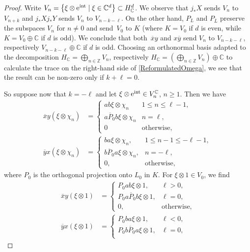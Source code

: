 \documentclass[10pt,a4paper]{amsart}
\numberwithin{equation}{section}
\newcommand{\Z}{\mathbb{Z}}
\newcommand{\C}{\mathbb{C}}
\begin{document}
\begin{proof}
Write $V_n = \big\{\xi \otimes {\rm e}^{\rm int} \mid \xi \in \C^d\big\} \subset H^d_\C$.
We observe that $j_*X$ sends $V_n$ to $V_{n+k}$ and $j_*Xj_*Y$ sends $V_n$ to $V_{n-k-\ell}$.
On the other hand, $P_L$ and $P_{\overline{L}}$ preserve the subspaces $V_n$ for $n \neq 0$ and send~$V_0$ to $K$ (where $K = V_0$ if $d$ is even, while $K = V_0 \oplus \C$ if $d$ is odd).
We conclude that both~$\overline{x} y$ and $x \overline{y}$ send $V_n$ to $V_{n-k-\ell}$, respectively $V_{n-k-\ell} \oplus \C$ if $d$ is odd.
Choosing an orthonormal basis adapted to the decomposition $H_\C = \bigoplus_{n \in \Z} V_n$, respectively $H_\C = (\bigoplus_{n \in \Z} V_n) \oplus \C$ to calculate the trace on the right-hand side of \eqref{ReformulatedOmega}, we see that the result can be non-zero only if $k+\ell = 0$.

So suppose now that $k = - \ell$ and let $\xi \otimes {\rm e}^{{\rm int}} \in V_n^\C$, $n \geq 1$. Then we have
\begin{align*}
 \overline{x}y(\xi\otimes \chi_n) &=
 \begin{cases}
 ab\xi \otimes \chi_{n} & 1 \leq n \leq \ell -1, \\
 a\overline{P}_0b\xi \otimes \chi_{n} & n = \ell,\\
 0 & \text{otherwise},
 \end{cases}
 \\
 \overline{y}x(\xi \otimes \chi_n) &=
 \begin{cases}
 ba\xi \otimes \chi_{n}, & 1 \leq n -1 \leq -\ell -1, \\
 b\overline{P}_0a\xi \otimes \chi_{n}, & n = - \ell,\\
 0, & \text{otherwise},
 \end{cases}	
\end{align*}
where $P_0$ is the orthogonal projection onto $L_0$ in $K$.
For $\xi \otimes 1 \in V_0$, we find
\begin{align*}
 \overline{x}y(\xi\otimes 1) &=
 \begin{cases}
 P_0ab\xi \otimes 1, & \ell > 0, \\
 P_0a\overline{P}_0b\xi \otimes 1, & \ell = 0,\\
 0, & \text{otherwise},
 \end{cases}
 \\
 \overline{y}x(\xi \otimes 1) &=
 \begin{cases}
 P_0ba\xi \otimes 1, & \ell < 0, \\
 P_0b\overline{P}_0a\xi \otimes 1, & \ell = 0,\\

\end{cases}
\end{align*}
\end{proof}
\end{document}
